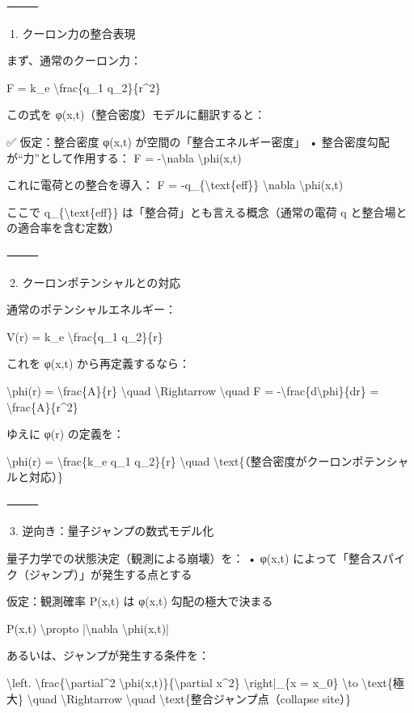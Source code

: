 \documentclass{article}
\begin{document}
⸻ 

🔹1. クーロン力の整合表現 

まず、通常のクーロン力： 

F = k\_e \textbackslash{}frac\{q\_1 q\_2\}\{r\textasciicircum{}2\} 

この式を φ(x,t)（整合密度）モデルに翻訳すると： 

✅ 仮定：整合密度 φ(x,t) が空間の「整合エネルギー密度」 
• 整合密度勾配が“力”として作用する： 
F = -\textbackslash{}nabla \textbackslash{}phi(x,t) 

これに電荷との整合を導入： 
F = -q\_\{\textbackslash{}text\{eff\}\} \textbackslash{}nabla \textbackslash{}phi(x,t) 

ここで q\_\{\textbackslash{}text\{eff\}\} は「整合荷」とも言える概念（通常の電荷 q と整合場との適合率を含む定数） 

⸻ 

🔹2. クーロンポテンシャルとの対応 

通常のポテンシャルエネルギー： 

V(r) = k\_e \textbackslash{}frac\{q\_1 q\_2\}\{r\} 

これを φ(x,t) から再定義するなら： 

\textbackslash{}phi(r) = \textbackslash{}frac\{A\}\{r\} 
\textbackslash{}quad \textbackslash{}Rightarrow \textbackslash{}quad 
F = -\textbackslash{}frac\{d\textbackslash{}phi\}\{dr\} = \textbackslash{}frac\{A\}\{r\textasciicircum{}2\} 

ゆえに φ(r) の定義を： 

\textbackslash{}phi(r) = \textbackslash{}frac\{k\_e q\_1 q\_2\}\{r\} 
\textbackslash{}quad \textbackslash{}text\{（整合密度がクーロンポテンシャルと対応）\} 

⸻ 

🔹3. 逆向き：量子ジャンプの数式モデル化 

量子力学での状態決定（観測による崩壊）を： 
• φ(x,t) によって「整合スパイク（ジャンプ）」が発生する点とする 

仮定：観測確率 P(x,t) は φ(x,t) 勾配の極大で決まる 

P(x,t) \textbackslash{}propto |\textbackslash{}nabla \textbackslash{}phi(x,t)| 

あるいは、ジャンプが発生する条件を： 

\textbackslash{}left. \textbackslash{}frac\{\textbackslash{}partial\textasciicircum{}2 \textbackslash{}phi(x,t)\}\{\textbackslash{}partial x\textasciicircum{}2\} \textbackslash{}right|\_\{x = x\_0\} \textbackslash{}to \textbackslash{}text\{極大\} 
\textbackslash{}quad \textbackslash{}Rightarrow \textbackslash{}quad \textbackslash{}text\{整合ジャンプ点（collapse site）\} 
\end{document}
